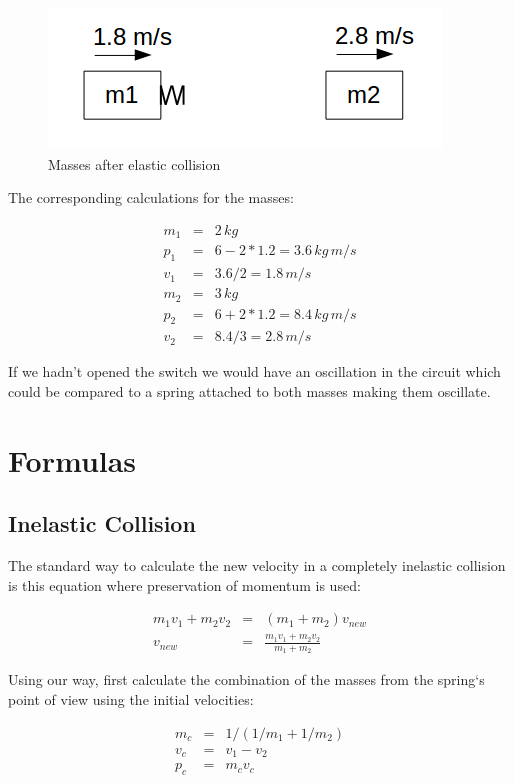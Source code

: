 \documentclass[]{../common/elementary-physics}
\begin{document}
\begin{figure}[ht] \centering
	\includegraphics[scale=.5]{mms3} \caption{Masses after elastic collision}
\end{figure}

The corresponding calculations for the masses:

\begin{eqnarray}
m_1 &=& 2 \, kg \\
p_1 &=& 6 - 2*1.2 = 3.6 \, kg \, m/s \\
v_1 &=& 3.6 / 2 = 1.8 \, m/s \\
m_2 &=& 3 \, kg \\
p_2 &=& 6 + 2*1.2 = 8.4 \, kg \, m/s \\
v_2 &=& 8.4 / 3 = 2.8 \, m/s 
\end{eqnarray}

If we hadn't opened the switch we would have an oscillation in the circuit which could be compared to a spring attached to both masses making them oscillate.

\section{Formulas}

\subsection{Inelastic Collision}

The standard way to calculate the new velocity in a completely inelastic collision is this equation where preservation of momentum is used:

\begin{eqnarray}
m_1 v_1 + m_2 v_2 &=& (m_1 + m_2)v_{new} \\
v_{new} &=& \frac{m_1 v_1 + m_2 v_2}{m_1 + m_2}
\end{eqnarray}

Using our way, first calculate the combination of the masses from the spring`s point of view using the initial velocities:

\begin{eqnarray}
m_c &=& 1/(1/m_1 + 1/m_2) \\
v_c &=& v_1 - v_2 \\
p_c &=& m_c v_c
\end{eqnarray}
\end{document}
